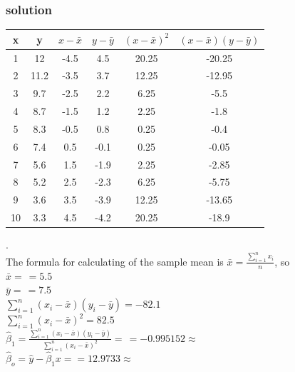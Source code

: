 \documentclass[a4paper,12pt,titlepage]{article} %
\begin{document}
\subsubsection{solution}
  \begin{tabular}{|c|c|c|c|c|c|}
    \hline
    x & y & $ x - \bar{x} $ & $ y - \bar{y} $ & $ (x - \bar{x})^{2} $ & $ (x - \bar{x})(y - \bar{y}) $ \\
    \hline
    1	& 12	& -4.5	& 4.5	& 20.25	& -20.25	\\
    \hline
    2	& 11.2	& -3.5	& 3.7	& 12.25	& -12.95	\\
    \hline
    3	& 9.7	& -2.5	& 2.2	& 6.25	& -5.5  	\\
    \hline
    4	& 8.7	& -1.5	& 1.2	& 2.25	& -1.8  	\\
    \hline
    5	& 8.3	& -0.5	& 0.8	& 0.25	& -0.4  	\\
    \hline
    6	& 7.4	& 0.5	& -0.1	& 0.25	& -0.05 	\\
    \hline
    7	& 5.6	& 1.5	& -1.9	& 2.25	& -2.85 	\\
    \hline
    8	& 5.2	& 2.5	& -2.3	& 6.25	& -5.75 	\\
    \hline
    9	& 3.6	& 3.5	& -3.9	& 12.25	& -13.65	\\
    \hline
    10	& 3.3	& 4.5	& -4.2	& 20.25	& -18.9 	\\
    \hline
  \end{tabular}

.\\

The formula for calculating of the sample mean is $ \bar{x} = \frac{\sum_{i=1}^{n} x_{i}}{n} $, so \\

$\bar{x} = \frac{}{} = 5.5 $ \\

$\bar{y} = \frac{}{} = 7.5 $ \\

$ \sum_{i=1}^{n} (x_{i}-\bar{x}) (y_{i}-\bar{y}) = -82.1 $ \\

$ \sum_{i=1}^{n} (x_{i}-\bar{x})^{2} = 82.5 $ \\

$ \hat{\beta}_{1} = \frac{\sum_{i=1}^{n} (x_{i}-\bar{x}) (y_{i}-\bar{y})}{ \sum_{i=1}^{n} (x_{i}-\bar{x})^{2} } = \frac{}{} = -0.995152 \approx  $ \\

$ \hat{\beta}_{o} = \hat{y} - \hat{\beta}_{1} x =  = 12.9733 \approx  $ \\
\end{document}
